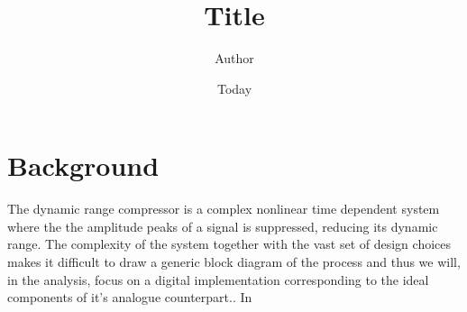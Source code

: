 \documentclass[]{article}
\begin{document}
\title{Title}
\author{Author}
\date{Today}
\maketitle
\section{Background}
The dynamic range compressor is a complex nonlinear time dependent system where the the amplitude peaks of a signal is suppressed, reducing its dynamic range. The complexity of the system together with the vast set of design choices makes it difficult to draw a generic block diagram of the process\cite{giannoullis}  and thus we will, in the analysis, focus on a digital implementation corresponding to the ideal components of it's analogue counterpart..
In 

\end{document}
